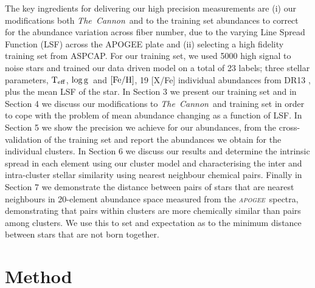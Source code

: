\documentclass[14pt, preprint2]{aastex6}
\newcommand{\project}[1]{\textsl{#1}}
\newcommand{\tc}{\project{The~Cannon}}
\newcommand{\apogee}{\project{\textsc{apogee}}}
\newcommand{\teff}{\mbox{$\rm T_{eff}$}}
\newcommand{\feh}{\mbox{$\rm [Fe/H]$}}
\newcommand{\logg}{\mbox{$\rm \log g$}}
\begin{document}
The key ingredients for delivering our high precision measurements are (i) our modifications both \tc\ and to the training set abundances to correct for the abundance variation across fiber number, due to the varying Line Spread Function (LSF) across the APOGEE plate and (ii) selecting a high fidelity training set from ASPCAP. For our training set, we used 5000 high signal to noise stars and trained our data driven model on a total of 23 labels;  three stellar parameters, \teff, \logg\ and \feh, 19 [X/Fe] individual abundances from DR13 \citep{Holtzman2015}, plus the mean LSF of the star.   In Section 3 we present our training set and in Section 4 we discuss our modifications to \tc\ and training set in order to cope with the problem of mean abundance changing as a function of LSF. In Section 5 we show the precision we achieve for our abundances, from the cross-validation of the training set and report the abundances we obtain for the individual clusters. In Section 6 we discuss our results and determine the intrinsic spread in each element using our cluster model and characterising the inter and intra-cluster stellar similarity using nearest neighbour chemical pairs.  Finally in Section 7 we demonstrate the distance between pairs of stars that are nearest neighbours in 20-element abundance space measured from the \apogee\ spectra, demonstrating that pairs within clusters are more chemically similar than pairs among clusters. We use this to set and expectation as to the minimum distance between stars that are not born together. 


\section{Method}
\end{document}
